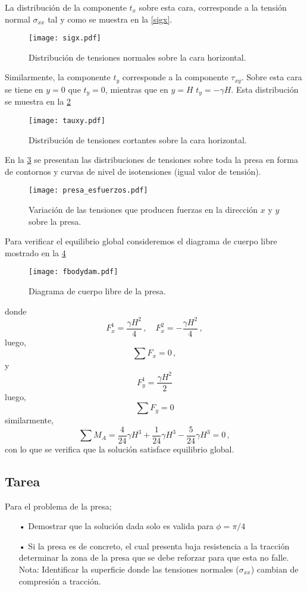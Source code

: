 \documentclass[../notas medios.tex]{subfiles}
\begin{document}
La distribución de la componente $t_x$ sobre esta cara, corresponde a la tensión normal $\sigma_{xx}$ tal y como se muestra en la \cref{sigx}.
\begin{figure}[H]
\centering
	\texttt{[image: sigx.pdf]}
	\caption{Distribución de tensiones normales sobre la cara horizontal.}
	\label{sigy}
\end{figure}

Similarmente, la componente $t_y$ corresponde a la componente $\tau_{xy}$. Sobre esta cara se tiene en $y=0$  que $t_y = 0$, mientras que en $y=H$ $t_y = - \gamma H$. Esta distribución se muestra en la \cref{taoxy}
\begin{figure}[H]
\centering
	\texttt{[image: tauxy.pdf]}
	\caption{Distribución de tensiones cortantes sobre la cara horizontal.}
	\label{taoxy}
\end{figure}


En la \cref{fig:contornos_presa} se presentan las distribuciones de tensiones sobre toda la presa en forma de contornos y curvas de nivel de isotensiones (igual valor de tensión).
\begin{figure}[H]
     \centering
     \texttt{[image: presa\_esfuerzos.pdf]}
     \caption{Variación de las tensiones que producen fuerzas en la dirección $x$ y $y$ sobre la presa.}
     \label{fig:contornos_presa}
\end{figure}


Para verificar el equilibrio global consideremos el diagrama de cuerpo libre mostrado en la \cref{dcl}
\begin{figure}[H]
\centering
	\texttt{[image: fbodydam.pdf]}
	\caption{Diagrama de cuerpo libre de la presa.}
	\label{dcl}
\end{figure}
donde
\[F_x^1 = \frac{\gamma H^2}{4}\, ,\quad
F_x^2 =  - \frac{\gamma H^2}{4}\, ,\]
luego,
\[\sum F_x = 0 \, , \]
y
\[F_y^1 = \frac{\gamma H^2}{2}\]
luego,
\[\sum F_y = 0 \]
similarmente,
\[\sum M_A =  \frac{4}{24}\gamma H^3 + \frac{1}{24}\gamma H^3 - \frac{5}{24}\gamma H^3 = 0\, ,\]
con lo que se verifica que la solución satisface equilibrio global.

\subsection*{Tarea}
Para el problema de la presa;

\begin{itemize}
\item[•] Demostrar que la solución dada solo es valida para $\phi = \pi/4$
\item[•] Si la presa es de concreto, el cual presenta baja resistencia a la tracción determinar la zona de la presa que se debe reforzar para que esta no falle. Nota: Identificar la superficie donde las tensiones normales ($\sigma_{xx}$) cambian de compresión a tracción.
\end{itemize}
\end{document}
